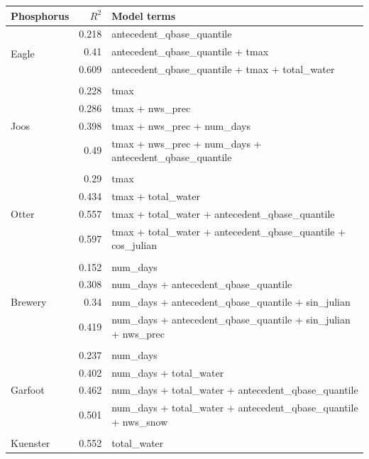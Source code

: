 \documentclass[10pt]{article}
\begin{document}
\begin{table}[h] \small
    \begin{center}
    \begin{tabular}{lrl}
    \textbf{Phosphorus} & $R^2$ & Model terms \\
    \hline
\multirow{4}{*}{Eagle} & 0.218 & antecedent\_qbase\_quantile\\ 
 & 0.41 & antecedent\_qbase\_quantile + tmax\\ 
 & 0.609 & antecedent\_qbase\_quantile + tmax + total\_water\\ 
\vspace{2mm}\\ \multirow{5}{*}{Joos} & 0.228 & tmax\\ 
 & 0.286 & tmax + nws\_prec\\ 
 & 0.398 & tmax + nws\_prec + num\_days\\ 
 & 0.49 & tmax + nws\_prec + num\_days + antecedent\_qbase\_quantile\\ 
\vspace{2mm}\\ \multirow{5}{*}{Otter} & 0.29 & tmax\\ 
 & 0.434 & tmax + total\_water\\ 
 & 0.557 & tmax + total\_water + antecedent\_qbase\_quantile\\ 
 & 0.597 & tmax + total\_water + antecedent\_qbase\_quantile + cos\_julian\\ 
\vspace{2mm}\\ \multirow{5}{*}{Brewery} & 0.152 & num\_days\\ 
 & 0.308 & num\_days + antecedent\_qbase\_quantile\\ 
 & 0.34 & num\_days + antecedent\_qbase\_quantile + sin\_julian\\ 
 & 0.419 & num\_days + antecedent\_qbase\_quantile + sin\_julian + nws\_prec\\ 
\vspace{2mm}\\ \multirow{5}{*}{Garfoot} & 0.237 & num\_days\\ 
 & 0.402 & num\_days + total\_water\\ 
 & 0.462 & num\_days + total\_water + antecedent\_qbase\_quantile\\ 
 & 0.501 & num\_days + total\_water + antecedent\_qbase\_quantile + nws\_snow\\ 
\vspace{2mm}\\ \multirow{3}{*}{Kuenster} & 0.552 & total\_water\\ 

\end{tabular}
\end{center}
\end{table}
\end{document}
